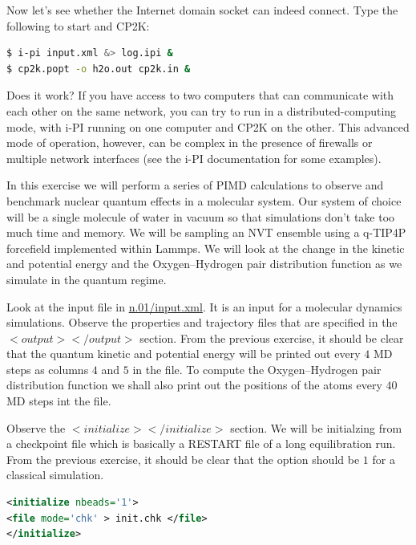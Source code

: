 \documentclass{article}
\begin{document}
\begin{Exercise}[label={inputs},title={Keywords, outputs, and units of \ipi{}}]
\Question
Now let's see whether the Internet domain socket can indeed connect.
Type the following to start \ipi{} and CP2K:
\begin{lstlisting}[language=bash]
$ i-pi input.xml &> log.ipi &
$ cp2k.popt -o h2o.out cp2k.in &
\end{lstlisting}
Does it work? If you have access to two computers that can communicate with each
other on the same network, you can try to run in a distributed-computing mode,
with i-PI running on one computer and CP2K on the other. This advanced mode of 
operation, however, can be complex in the presence of firewalls or multiple 
network interfaces (see the i-PI documentation for some examples). 

\end{Exercise}

\begin{Exercise}[label={water},title={Benchmark of quantum effects in a water molecule}]
\noindent In this exercise we will perform a series of PIMD calculations to observe and benchmark nuclear quantum effects in a molecular system. Our system of choice will be a single molecule of water in vacuum so that simulations don't take too much time and memory. We will be sampling an NVT ensemble using a q-TIP4P forcefield implemented within Lammps. We will look at the change in the kinetic and potential energy and the Oxygen--Hydrogen pair distribution function as we simulate in the quantum regime.

\Question
Look at the \ipi{} input file in \url{n.01/input.xml}. It is an \ipi{} input for a molecular dynamics simulations. Observe the 
properties and trajectory files that are specified in the \lstinxml$<output></output>$ section. From the previous exercise, 
it should be clear that the quantum kinetic and potential energy will be printed out every $4$ MD steps as columns $4$ and $5$ in the  file. To compute the Oxygen--Hydrogen pair distribution function we shall also print out the positions of the atoms every $40$ MD steps int the  file.

\Question
Observe the \lstinxml$<initialize></initialize>$ section. We will be initialzing from a checkpoint file 
 which is basically a RESTART file of a long equilibration run. 
From the previous exercise, it should be clear that the option  should be $1$ for a classical simulation.

\begin{lstlisting}[language=xml]
<initialize nbeads='1'>  
<file mode='chk' > init.chk </file>
</initialize>
\end{lstlisting}


\end{Exercise}
\end{document}
